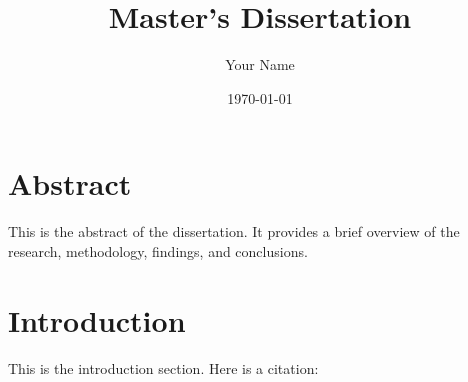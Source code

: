 \documentclass{article}%
\title{Master's Dissertation}%
\author{Your Name}%
\date{\today}%
\begin{document}
%
\normalsize%
\maketitle%
\section*{Abstract}%
\label{sec:Abstract}%
This is the abstract of the dissertation. It provides a brief overview of the research, methodology, findings, and conclusions.

%
\tableofcontents%
\newpage%
\listoffigures%
\newpage%
\listoftables%
\newpage%
\section{Introduction}%
\label{sec:Introduction}%
This is the introduction section. Here is a citation: %
\cite{example_reference}

%
\newpage%
\printbibliography%
\end{document}
